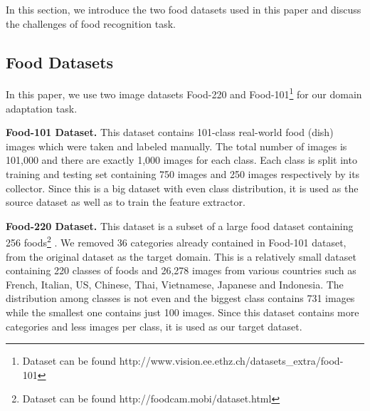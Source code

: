 In this section, we introduce the two food datasets used in this paper and discuss the challenges of food recognition task.
\subsection{Food Datasets}
 In this paper, we use two image datasets Food-220 and Food-101\footnote{Dataset can be found http://www.vision.ee.ethz.ch/datasets\_extra/food-101} \cite{bossard2014food} for our domain adaptation task.

\textbf{Food-101 Dataset.}
This dataset contains 101-class real-world food (dish) images which were taken and labeled manually. The total number of images is 101,000 and there are exactly 1,000 images for each class. Each class is split into training and testing set containing 750 images and 250 images respectively by its collector. Since this is a big dataset with even class distribution, it is used as the source dataset as well as to train the feature extractor.

\textbf{Food-220 Dataset.}
This dataset is a subset of a large food dataset containing 256 foods\footnote{Dataset can be found http://foodcam.mobi/dataset.html} \cite{kawano14c}. We removed 36 categories already contained in Food-101 dataset, from the original dataset as the target domain. This is a relatively small dataset containing 220 classes of foods and 26,278 images from various countries such as French, Italian, US, Chinese, Thai, Vietnamese, Japanese and Indonesia. The distribution among classes is not even and the biggest class contains 731 images while the smallest one contains just 100 images. Since this dataset contains more categories and less images per class, it is used as our target dataset.

